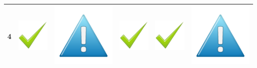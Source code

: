 \documentclass[12pt]{article}
\begin{document}
\begin{center}
\begin{tabular}{*{6}{|c}|}
    4 &\includegraphics[scale=0.2]{Billeder/godt} &  \includegraphics[scale=0.1]{Billeder/mindre}&  \includegraphics[scale=0.2]{Billeder/godt}& \includegraphics[scale=0.2]{Billeder/godt}&  \includegraphics[scale=0.1]{Billeder/mindre}\\
    \hline

\end{tabular}
\end{center}
\end{document}
